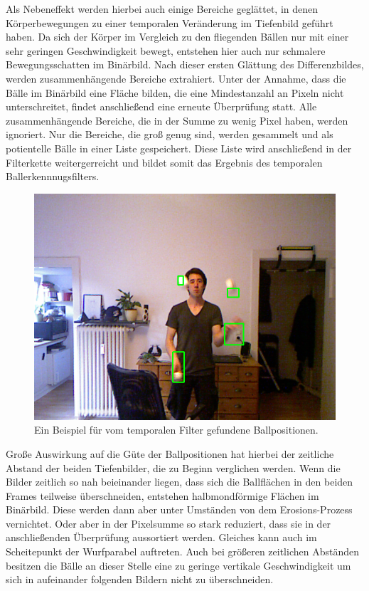 \documentclass[12pt,a4paper,ngerman]{scrartcl}
\begin{document}
Als Nebeneffekt werden hierbei auch einige Bereiche geglättet, in denen Körperbewegungen zu einer temporalen Veränderung im Tiefenbild geführt haben. Da sich der Körper im Vergleich zu den fliegenden Bällen nur mit einer sehr geringen Geschwindigkeit bewegt, entstehen hier auch nur schmalere Bewegungsschatten im Binärbild.
Nach dieser ersten Glättung des Differenzbildes, werden zusammenhängende Bereiche extrahiert.
Unter der Annahme, dass die Bälle im Binärbild eine Fläche bilden, die eine Mindestanzahl an Pixeln nicht unterschreitet, findet anschließend eine erneute Überprüfung statt. Alle zusammenhängende Bereiche, die in der Summe zu wenig Pixel haben, werden ignoriert.
Nur die Bereiche, die groß genug sind, werden gesammelt und als potientelle Bälle in einer Liste gespeichert.
Diese Liste wird anschließend in der Filterkette weitergerreicht und bildet somit das Ergebnis des temporalen Ballerkennnugsfilters.

\begin{figure}[H]
    \centering
    \includegraphics[scale=0.6]{img/temporal_final.png}
    \caption{Ein Beispiel für vom temporalen Filter gefundene Ballpositionen.}
    \label{temporal_final}
\end{figure}

Große Auswirkung auf die Güte der Ballpositionen hat hierbei der zeitliche Abstand der beiden Tiefenbilder, die zu Beginn verglichen werden. Wenn die Bilder zeitlich so nah beieinander liegen, dass sich die Ballflächen in den beiden Frames teilweise überschneiden, entstehen halbmondförmige Flächen im Binärbild.
Diese werden dann aber unter Umständen von dem Erosions-Prozess vernichtet.
Oder aber in der Pixelsumme so stark reduziert, dass sie in der anschließenden Überprüfung aussortiert werden.
Gleiches kann auch im Scheitepunkt der Wurfparabel auftreten. Auch bei größeren zeitlichen Abständen besitzen die Bälle an dieser Stelle eine zu geringe vertikale Geschwindigkeit um sich in aufeinander folgenden Bildern nicht zu überschneiden.
\end{document}
